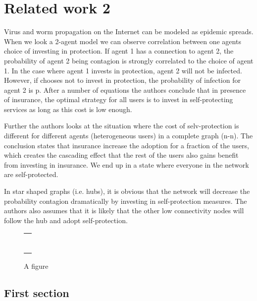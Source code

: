 \chapter{Related work 2}
\label{chp:relatedwork2} 


Virus and worm propagation on the Internet can be modeled as epidemic spreads. 
When we look a 2-agent model we can observe correlation between one agents choice of investing in 
protection. If agent 1 has a connection to agent 2, the probability of agent 2 being contagion is 
strongly correlated to the choice of agent 1. In the case where agent 1 invests in protection,
 agent 2 will not be infected. However, if chooses not to invest in protection, the probability 
 of infection for agent 2 is p.
 After a number of equations the authors conclude that in presence of insurance, the optimal 
 strategy for all users is to invest in self-protecting services as long as this cost is low
  enough.

Further the authors looks at the situation where the cost of selv-protection is different for 
different agents (heterogeneous users) in a complete graph (n-n). The conclusion states that
 insurance increase the adoption for a fraction of the users, which creates the cascading effect
 that the rest of the users also gains benefit from investing in insurance. We end up in a state
  where everyone in the network are self-protected. 

In star shaped graphs (i.e. hubs), it is obvious that the network will decrease the probability
 contagion dramatically by investing in self-protection measures. The authors also assumes that it
 is likely that the other low connectivity nodes will follow the hub and adopt self-protection. 
 




\Blindtext[3][1]

\begin{figure}
\centering
\begin{tabular}{@{}c@{}}
\rule{.5\textwidth}{.5\textwidth} \\
\end{tabular}
\caption{\label{fig:example}A figure}
\end{figure}

\section{First section}\label{sec:first_section}

